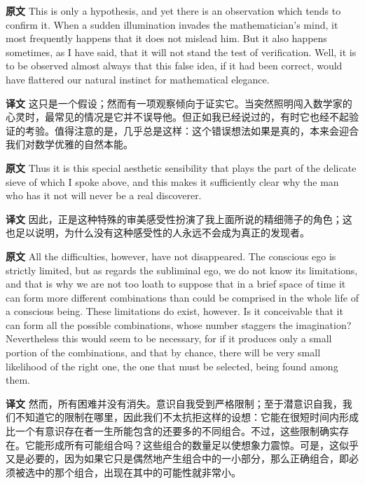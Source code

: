 \documentclass[UTF8,zihao=-4]{ctexart}
\newcommand{\BodyFont}{\fontsize{10.5pt}{15.5pt}\selectfont}
\newcommand{\origlabel}{\textbf{原文}\quad}
\newcommand{\translabel}{\textbf{译文}\quad}
\newenvironment{enblock}{\par\noindent\begingroup\BodyFont\origlabel}{\par\endgroup}
\newenvironment{zhblock}{\par\noindent\begingroup\BodyFont\translabel}{\par\endgroup\vspace{0.35em}}
\begin{document}
\begin{enblock}
This is only a hypothesis, and yet there is an observation which tends to confirm it. When a sudden illumination invades the mathematician's mind, it most frequently happens that it does not mislead him. But it also happens sometimes, as I have said, that it will not stand the test of verification. Well, it is to be observed almost always that this false idea, if it had been correct, would have flattered our natural instinct for mathematical elegance.
\end{enblock}
\begin{zhblock}
这只是一个假设；然而有一项观察倾向于证实它。当突然照明闯入数学家的心灵时，最常见的情况是它并不误导他。但正如我已经说过的，有时它也经不起验证的考验。值得注意的是，几乎总是这样：这个错误想法如果是真的，本来会迎合我们对数学优雅的自然本能。\end{zhblock}

\begin{enblock}
Thus it is this special aesthetic sensibility that plays the part of the delicate sieve of which I spoke above, and this makes it sufficiently clear why the man who has it not will never be a real discoverer.
\end{enblock}
\begin{zhblock}
因此，正是这种特殊的审美感受性扮演了我上面所说的精细筛子的角色；这也足以说明，为什么没有这种感受性的人永远不会成为真正的发现者。\end{zhblock}

\begin{enblock}
All the difficulties, however, have not disappeared. The conscious ego is strictly limited, but as regards the subliminal ego, we do not know its limitations, and that is why we are not too loath to suppose that in a brief space of time it can form more different combinations than could be comprised in the whole life of a conscious being. These limitations do exist, however. Is it conceivable that it can form all the possible combinations, whose number staggers the imagination? Nevertheless this would seem to be necessary, for if it produces only a small portion of the combinations, and that by chance, there will be very small likelihood of the right one, the one that must be selected, being found among them.
\end{enblock}
\begin{zhblock}
然而，所有困难并没有消失。意识自我受到严格限制；至于潜意识自我，我们不知道它的限制在哪里，因此我们不太抗拒这样的设想：它能在很短时间内形成比一个有意识存在者一生所能包含的还要多的不同组合。不过，这些限制确实存在。它能形成所有可能组合吗？这些组合的数量足以使想象力震惊。可是，这似乎又是必要的，因为如果它只是偶然地产生组合中的一小部分，那么正确组合，即必须被选中的那个组合，出现在其中的可能性就非常小。\end{zhblock}
\end{document}
